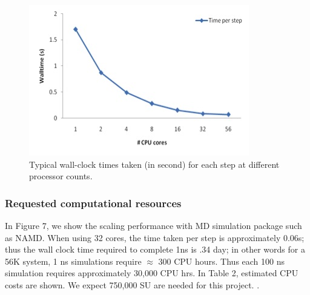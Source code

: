 \documentclass[a4paper,10pt]{article}
\begin{document}

\begin{figure}
  \includegraphics[scale=0.660]{56k_scaling-2} \caption{Typical wall-clock times taken (in second) for each step at different processor counts.  }
\end{figure}


\subsubsection*{Requested computational resources}

In Figure 7, we show the scaling performance with MD simulation package such as NAMD.  When using 32 cores, the time taken per step is approximately 0.06s; thus the wall clock time required to complete 1ns is .34 day; in other words for a 56K system, 1 ns simulations require $\approx$ 300 CPU hours.   Thus each 100 ns simulation requires approximately 30,000 CPU hrs. In Table 2, estimated CPU costs are shown.  We expect 750,000 SU are needed for this project. .
\end{document}
